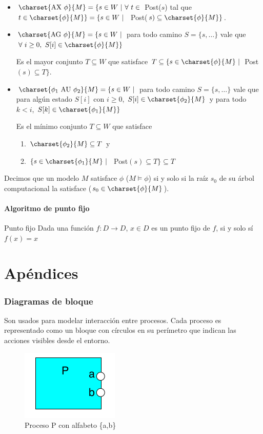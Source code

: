 \begin{itemize}
\item $\charset{\text{AX }\phi}{M} = \{s\in W~|~\forall~t\in$ Post($s$) tal que $t\in\charset{\phi}{M}\} = \{ s \in W~|~$ Post($s) \subseteq \charset{\phi}{M}\}$.
\item $\charset{\text{AG }\phi}{M} = \{s\in W~|$ para todo camino $S=\{s,\dots\}$ vale que $\forall~i\geq 0,~S[i]\in\charset{\phi}{M} \}$

Es el mayor conjunto $T\subseteq W$ que satisface $T \subseteq \{ s \in\charset{\phi}{M}~|$ Post$(s) \subseteq T \}$.

\item $\charset{\phi_1 \text{ AU }\phi_2}{M} = \{s\in W~|$ para todo camino $S=\{s,\dots\}$ vale que para algún estado $S[i]$ con $i\geq 0$, $S[i]\in\charset{\phi_2}{M}$ y para todo $k < i$, $S[k]\in\charset{\phi_1}{M} \}$

Es el mínimo conjunto $T\subseteq W$ que satisface 
\begin{enumerate}
\item $\charset{\phi_2}{M} \subseteq T$ y
\item $\{s\in\charset{\phi_1}{M} ~|~$ Post$(s)\subseteq T\} \subseteq T$
\end{enumerate}
\end{itemize}


Decimos que un modelo $M$ satisface $\phi$ ($M\vDash \phi$) si y solo si la raíz $s_0$ de su árbol computacional la satisface ($s_0 \in\charset{\phi}{M}$).

\subsection{Algoritmo de punto fijo}
\begin{definicion}{Punto fijo}
Dada una función $f:D\to D$, $x\in D$ es un punto fijo de $f$, si y solo sí $f(x)=x$
\end{definicion}

\newpage
\part{Apéndices}
\appendix
\section{Diagramas de bloque}
Son usados para modelar interacción entre procesos. Cada proceso es representado como un bloque con círculos en su perímetro que indican las acciones visibles desde el entorno.
\begin{figure}[h]
\centering
	\includegraphics[scale=0.5]{imagenes/bloque_proceso}
	\caption{Proceso P con alfabeto \{a,b\}}
\end{figure}

